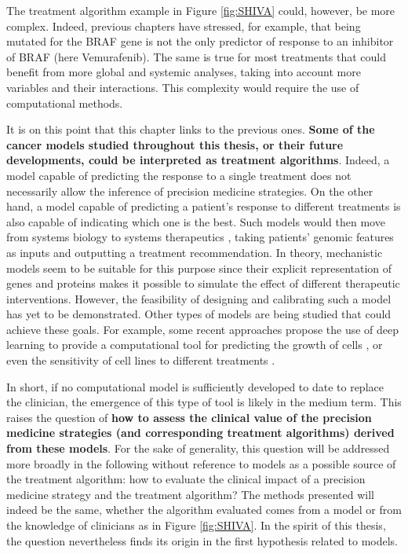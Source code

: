 \documentclass[a4paper,12pt,twoside,onecolumn,openright,final,oldfontcommands]{memoir}
\begin{document}
The treatment algorithm example in Figure \ref{fig:SHIVA} could,
however, be more complex. Indeed, previous chapters have stressed, for
example, that being mutated for the BRAF gene is not the only predictor
of response to an inhibitor of BRAF (here Vemurafenib). The same is true
for most treatments that could benefit from more global and systemic
analyses, taking into account more variables and their interactions.
This complexity would require the use of computational methods.

It is on this point that this chapter links to the previous ones.
\textbf{Some of the cancer models studied throughout this thesis, or
their future developments, could be interpreted as treatment
algorithms}. Indeed, a model capable of predicting the response to a
single treatment does not necessarily allow the inference of precision
medicine strategies. On the other hand, a model capable of predicting a
patient's response to different treatments is also capable of indicating
which one is the best. Such models would then move from systems biology
to systems therapeutics \citep{hansen2013computation}, taking patients'
genomic features as inputs and outputting a treatment recommendation. In
theory, mechanistic models seem to be suitable for this purpose since
their explicit representation of genes and proteins makes it possible to
simulate the effect of different therapeutic interventions. However, the
feasibility of designing and calibrating such a model has yet to be
demonstrated. Other types of models are being studied that could achieve
these goals. For example, some recent approaches propose the use of deep
learning to provide a computational tool for predicting the growth of
cells \citep{ma2018using}, or even the sensitivity of cell lines to
different treatments \citep{manica2019toward}.

In short, if no computational model is sufficiently developed to date to
replace the clinician, the emergence of this type of tool is likely in
the medium term. This raises the question of \textbf{how to assess the
clinical value of the precision medicine strategies (and corresponding
treatment algorithms) derived from these models}. For the sake of
generality, this question will be addressed more broadly in the
following without reference to models as a possible source of the
treatment algorithm: how to evaluate the clinical impact of a precision
medicine strategy and the treatment algorithm? The methods presented
will indeed be the same, whether the algorithm evaluated comes from a
model or from the knowledge of clinicians as in Figure \ref{fig:SHIVA}.
In the spirit of this thesis, the question nevertheless finds its origin
in the first hypothesis related to models.
\end{document}
